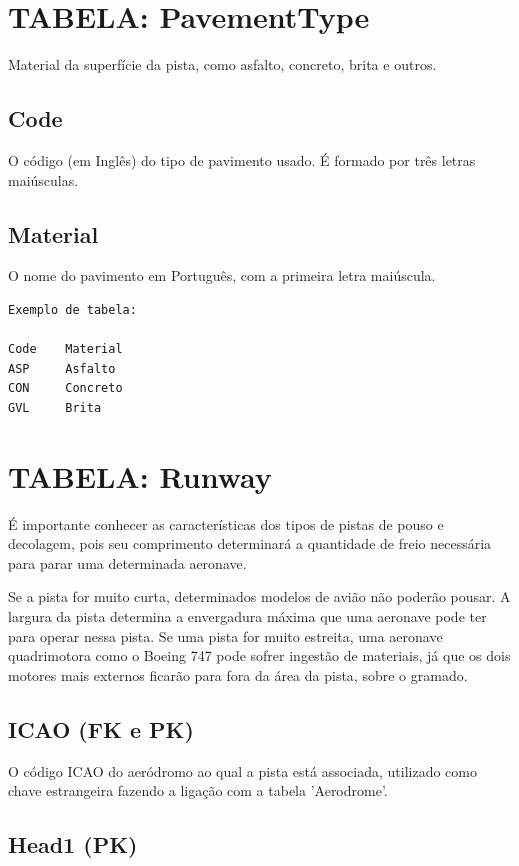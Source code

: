 \section{TABELA: PavementType}

Material da superfície da pista, como asfalto, concreto, brita e outros.

\subsection{Code}
O código (em Inglês) do tipo de pavimento usado. É formado por três letras maiúsculas.

\subsection{Material}
O nome do pavimento em Português, com a primeira letra maiúscula.

\begin{verbatim}
Exemplo de tabela:

Code    Material
ASP     Asfalto
CON     Concreto
GVL     Brita
\end{verbatim}


\section{TABELA: Runway}

É importante conhecer as características dos tipos de pistas de 
pouso e decolagem, pois seu comprimento determinará a quantidade de freio 
necessária para parar uma determinada aeronave.

Se a pista for muito curta, determinados modelos de avião não poderão pousar. 
A largura da pista determina a envergadura máxima que uma aeronave pode ter 
para operar nessa pista. Se uma pista for muito estreita, uma aeronave quadrimotora 
como o Boeing 747 pode sofrer ingestão de materiais, já que os dois motores mais 
externos ficarão para fora da área da pista, sobre o gramado.

\subsection{ICAO (FK e PK)}

O código ICAO do aeródromo ao qual a pista está associada, utilizado como chave estrangeira 
fazendo a ligação com a tabela 'Aerodrome'.

\subsection{Head1 (PK)}

